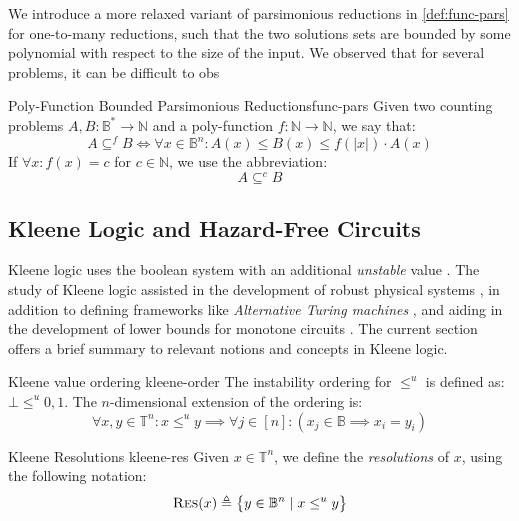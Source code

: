 We introduce a more relaxed variant of parsimonious reductions in \ref{def:func-pars}
for one-to-many reductions, such that the two solutions sets are bounded by some
polynomial with respect to the size of the input. We observed that for several problems,
it can be difficult to obs

\begin{definitionbox}{Poly-Function Bounded Parsimonious Reductions}{func-pars}
    \label{def:func-pars}
    Given two counting problems $A, B : \mathbb{B}^* \to \mathbb{N}$
    and a poly-function $f : \mathbb{N} \to \mathbb{N}$, we
    say that:
    $$
        A \subseteq^f B \iff \forall x \in \mathbb{B}^n:  A(x) \leq B(x) \leq f(|x|) \cdot A(x)
    $$
    If $\forall x : f(x) = c$ for $c \in \mathbb{N}$, we use the abbreviation:
    $$
        A \subseteq^c B
    $$
\end{definitionbox}


\subsection{Kleene Logic and Hazard-Free Circuits}

Kleene logic uses the boolean system with an additional \textit{unstable} value \cite{kleene_IntroductionMetamathematics_2009}.
The study of Kleene logic assisted in
the development of robust physical systems \cite{friedrichs_MetastabilityContainingCircuits_2018}, in addition to defining frameworks like \textit{Alternative Turing machines} \cite{kozen_TheoryComputation_2006}, and
aiding in the development of lower bounds for monotone circuits
\cite{eichelberger_HazardDetectionCombinational_1965, ikenmeyer_ComplexityHazardfreeCircuits_2019,ikenmeyer_KarchmerWigdersonGamesHazardfree_2022,  bund_SmallHazardFreeTransducers_2025}.
The current section offers a brief summary to relevant notions and concepts in Kleene logic.

\begin{definitionbox}{Kleene value ordering \cite{mukaidono_BternaryLogicFunction_1972}}{kleene-order}
    The instability ordering for $\leq^u$ is defined as: $\bot \leq^u 0,1$. The $n$-dimensional
    extension of the ordering is:
    $$
        \forall x,y \in \mathbb{T}^n: x \leq^u y \implies \forall j \in [n]: (x_j \in \mathbb{B} \implies x_i = y_i)
    $$
\end{definitionbox}


\begin{definitionbox}{Kleene Resolutions \cite{mukaidono_BternaryLogicFunction_1972, ikenmeyer_ComplexityHazardfreeCircuits_2019}}{kleene-res}
    Given $x \in \mathbb{T}^n$, we define the \textit{resolutions} of $x$, using the following notation:
    $$
        \textnormal{\textsc{Res}}(x) \triangleq \big\{ y \in \mathbb{B}^n \mid x \leq^u y  \big\}
    $$
\end{definitionbox}

